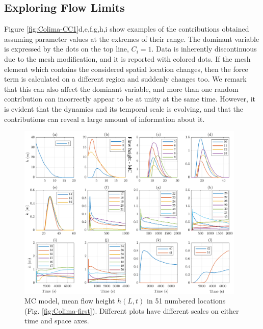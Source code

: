 \documentclass{article}
\begin{document}

\subsection{Exploring Flow Limits} \label{lhs_des_colima}
Figure \ref{fig:Colima-CC1}d,e,f,g,h,i show examples of the  contributions obtained assuming parameter values at the extremes of their range. The dominant variable is expressed by the dots on the top line, $C_i=1$. Data is inherently discontinuous due to the mesh modification, and it is reported with colored dots. If the mesh element which contains the considered spatial location changes, then the force term is calculated on a different region and suddenly changes too. We remark that this can also affect the dominant variable, and more than one random contribution can incorrectly appear to be at unity at the same time. However, it is evident that the dynamics and its temporal scale is evolving, and that the contributions can reveal a large amount of information about it.
\begin{figure}[H]
         \centering
        \includegraphics[width=0.97\textwidth]{figures/Colima/HeightMC_BAF.png}
        \caption{MC model, mean flow height $h(L,t)$ in 51 numbered locations (Fig. \ref{fig:Colima-first}). Different plots have different scales on either time and space axes.}
        \label{fig:BAF-H-MC}
\end{figure}
\end{document}
